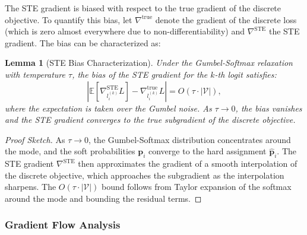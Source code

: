 \documentclass[preprint,12pt]{elsarticle}
\newtheorem{lemma}{Lemma}[section]
\begin{document}
The STE gradient is biased with respect to the true gradient of the discrete objective. To quantify this bias, let $\nabla^{\text{true}}$ denote the gradient of the discrete loss (which is zero almost everywhere due to non-differentiability) and $\nabla^{\text{STE}}$ the STE gradient. The bias can be characterized as:

\begin{lemma}[STE Bias Characterization]
\label{lem:ste_bias}
Under the Gumbel-Softmax relaxation with temperature $\tau$, the bias of the STE gradient for the $k$-th logit satisfies:
\begin{equation}
\label{eq:ste_bias}
\left| \mathbb{E}\left[\nabla^{\text{STE}}_{l_i^{(k)}} L\right] - \nabla^{\text{true}}_{l_i^{(k)}} L \right| = O(\tau \cdot |\mathcal{V}|),
\end{equation}
where the expectation is taken over the Gumbel noise. As $\tau \to 0$, the bias vanishes and the STE gradient converges to the true subgradient of the discrete objective.
\end{lemma}

\begin{proof}[Proof Sketch]
As $\tau \to 0$, the Gumbel-Softmax distribution concentrates around the mode, and the soft probabilities $\mathbf{p}_i$ converge to the hard assignment $\hat{\mathbf{p}}_i$. The STE gradient $\nabla^{\text{STE}}$ then approximates the gradient of a smooth interpolation of the discrete objective, which approaches the subgradient as the interpolation sharpens. The $O(\tau \cdot |\mathcal{V}|)$ bound follows from Taylor expansion of the softmax around the mode and bounding the residual terms.
\end{proof}

\subsubsection{Gradient Flow Analysis}
\label{sec:gradient_flow}
\end{document}
